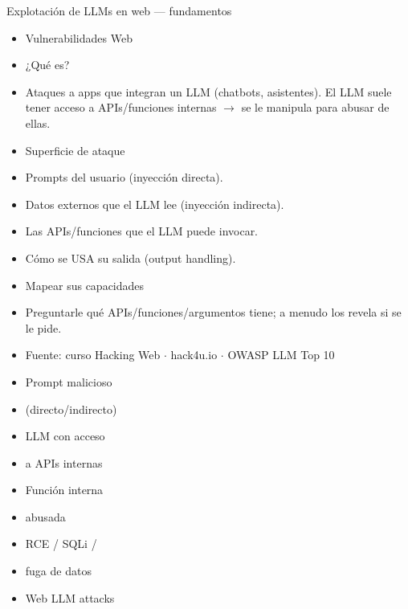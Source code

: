 \documentclass[aspectratio=169,10pt]{beamer}
\begin{document}
\begin{frame}[allowframebreaks]{Explotación de LLMs en web --- fundamentos}
\small
  \begin{itemize}
  \item Vulnerabilidades Web
  \item ¿Qué es?
  \item Ataques a apps que integran un LLM (chatbots, asistentes). El LLM suele tener acceso a APIs/funciones internas $\rightarrow$ se le manipula para abusar de ellas.
  \item Superficie de ataque
  \item Prompts del usuario (inyección directa).
  \item Datos externos que el LLM lee (inyección indirecta).
  \item Las APIs/funciones que el LLM puede invocar.
  \item Cómo se USA su salida (output handling).
  \item Mapear sus capacidades
  \item Preguntarle qué APIs/funciones/argumentos tiene; a menudo los revela si se le pide.
  \item Fuente: curso Hacking Web $\cdot$ hack4u.io $\cdot$ OWASP LLM Top 10
  \item Prompt malicioso
  \item (directo/indirecto)
  \item LLM con acceso
  \item a APIs internas
  \item Función interna
  \item abusada
  \item RCE / SQLi /
  \item fuga de datos
  \item Web LLM attacks
  \end{itemize}
\end{frame}
\end{document}
